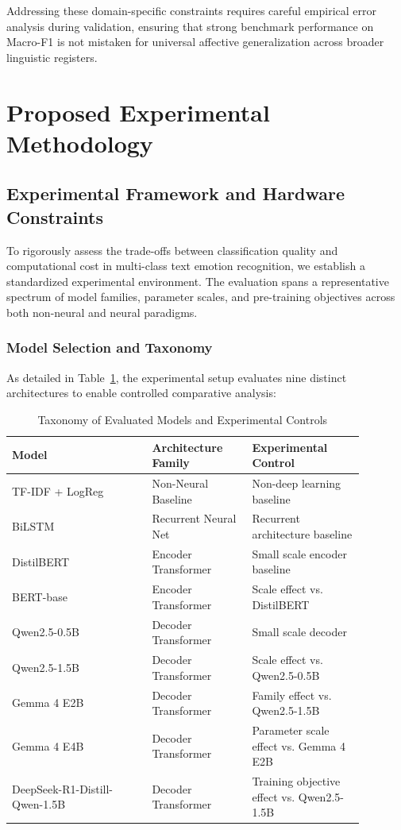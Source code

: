 \documentclass[conference]{IEEEtran}
\begin{document}
Addressing these domain-specific constraints requires careful empirical error analysis during validation, ensuring that strong benchmark 
performance on Macro-F1 is not mistaken for universal affective generalization across broader linguistic registers.

\section{Proposed Experimental Methodology}
\label{sec:methodology}

\subsection{Experimental Framework and Hardware Constraints}

To rigorously assess the trade-offs between classification quality and computational cost in multi-class text emotion recognition, 
we establish a standardized experimental environment. The evaluation spans a representative spectrum of model families, parameter scales, 
and pre-training objectives across both non-neural and neural paradigms.

\subsubsection{Model Selection and Taxonomy}
As detailed in Table~\ref{tab:model_taxonomy}, the experimental setup evaluates nine distinct architectures to enable controlled comparative analysis:

\begin{table}[htbp]
\centering
\caption{Taxonomy of Evaluated Models and Experimental Controls}
\label{tab:model_taxonomy}
\small
\begin{tabular}{p{0.35\linewidth} p{0.25\linewidth} p{0.28\linewidth}}
\toprule
\textbf{Model} & \textbf{Architecture Family} & \textbf{Experimental Control} \\
\midrule
TF-IDF + LogReg & Non-Neural Baseline & Non-deep learning baseline \\
BiLSTM & Recurrent Neural Net & Recurrent architecture baseline \\
DistilBERT & Encoder Transformer & Small scale encoder baseline \\
BERT-base & Encoder Transformer & Scale effect vs. DistilBERT \\
Qwen2.5-0.5B & Decoder Transformer & Small scale decoder \\
Qwen2.5-1.5B & Decoder Transformer & Scale effect vs. Qwen2.5-0.5B \\
Gemma 4 E2B & Decoder Transformer & Family effect vs. Qwen2.5-1.5B \\
Gemma 4 E4B & Decoder Transformer & Parameter scale effect vs. Gemma 4 E2B \\
DeepSeek-R1-Distill-Qwen-1.5B & Decoder Transformer & Training objective effect vs. Qwen2.5-1.5B \\
\bottomrule
\end{tabular}
\end{table}
\end{document}
